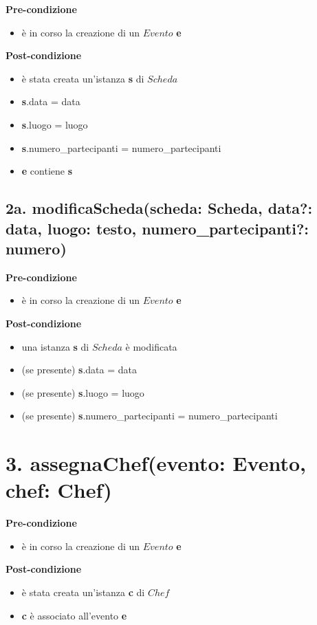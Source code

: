\documentclass[12pt]{extarticle}
\begin{document}
\textbf{Pre-condizione}
\begin{itemize}
  \item è in corso la creazione di un $Evento$ \textbf{e}
\end{itemize} 
\textbf{Post-condizione} 
\begin{itemize}
  \item è stata creata un'istanza \textbf{s} di $Scheda$
  \item \textbf{s}.data = data
  \item \textbf{s}.luogo = luogo
  \item \textbf{s}.numero\_partecipanti = numero\_partecipanti
  \item \textbf{e} contiene \textbf{s}
\end{itemize}

\subsection*{2a. modificaScheda(scheda: Scheda, data?: data, luogo: testo, numero\_partecipanti?: numero)}

\textbf{Pre-condizione}
\begin{itemize}
  \item è in corso la creazione di un $Evento$ \textbf{e}
\end{itemize} 
\textbf{Post-condizione}
\begin{itemize}
  \item una istanza \textbf{s} di $Scheda$ è modificata
  \item (se presente) \textbf{s}.data = data
  \item (se presente) \textbf{s}.luogo = luogo
  \item (se presente) \textbf{s}.numero\_partecipanti = numero\_partecipanti
\end{itemize} 


\section*{3. assegnaChef(evento: Evento, chef: Chef)}

\textbf{Pre-condizione}
\begin{itemize}
  \item è in corso la creazione di un $Evento$ \textbf{e}
\end{itemize}
\textbf{Post-condizione}
\begin{itemize}
  \item è stata creata un'istanza \textbf{c} di  $Chef$
  \item \textbf{c} è associato all'evento \textbf{e}
\end{itemize}
\end{document}
